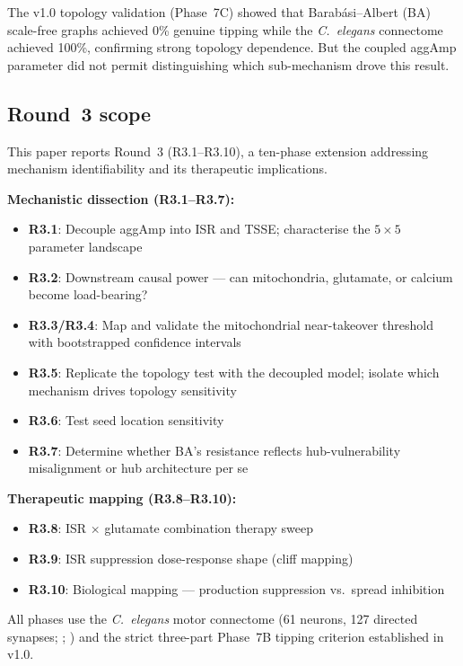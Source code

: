\documentclass[12pt,a4paper]{article}
\begin{document}
The v1.0 topology validation (Phase~7C) showed that Barab\'{a}si--Albert (BA) scale-free
graphs achieved 0\% genuine tipping while the \textit{C.~elegans} connectome achieved 100\%,
confirming strong topology dependence. But the coupled aggAmp parameter did not permit
distinguishing which sub-mechanism drove this result.

\subsection{Round~3 scope}

This paper reports Round~3 (R3.1--R3.10), a ten-phase extension addressing mechanism
identifiability and its therapeutic implications.

\textbf{Mechanistic dissection (R3.1--R3.7):}
\begin{itemize}
\item \textbf{R3.1}: Decouple aggAmp into ISR and TSSE; characterise the $5{\times}5$
      parameter landscape
\item \textbf{R3.2}: Downstream causal power --- can mitochondria, glutamate, or calcium
      become load-bearing?
\item \textbf{R3.3/R3.4}: Map and validate the mitochondrial near-takeover threshold with
      bootstrapped confidence intervals
\item \textbf{R3.5}: Replicate the topology test with the decoupled model; isolate which
      mechanism drives topology sensitivity
\item \textbf{R3.6}: Test seed location sensitivity
\item \textbf{R3.7}: Determine whether BA's resistance reflects hub-vulnerability misalignment
      or hub architecture per se
\end{itemize}

\textbf{Therapeutic mapping (R3.8--R3.10):}
\begin{itemize}
\item \textbf{R3.8}: ISR $\times$ glutamate combination therapy sweep
\item \textbf{R3.9}: ISR suppression dose-response shape (cliff mapping)
\item \textbf{R3.10}: Biological mapping --- production suppression vs.\ spread inhibition
\end{itemize}

All phases use the \textit{C.~elegans} motor connectome (61 neurons, 127 directed synapses;
\citealt{white1986}; \citealt{cook2019}) and the strict three-part Phase~7B tipping criterion
established in v1.0.
\end{document}
